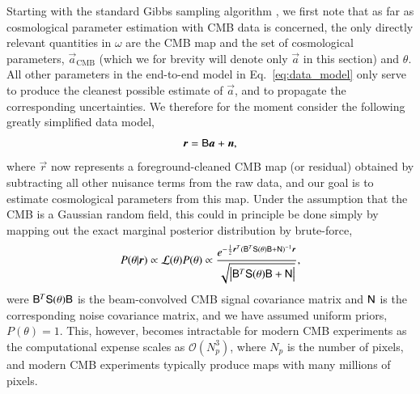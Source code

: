 \documentclass[twocolumn]{../common/aa}
\newcommand{\B}[0]{\tens{B}}
\newcommand{\n}[0]{\vec{n}}
\renewcommand{\a}[0]{\vec{a}}
\newcommand{\N}[0]{\tens{N}}
\renewcommand{\S}[0]{\tens{S}}
\renewcommand{\r}[0]{\vec{r}}
\begin{document}
Starting with the standard Gibbs sampling algorithm \citep{jewell2004,wandelt2004}, we first note that as far as cosmological parameter estimation with CMB data is concerned, the only directly relevant quantities in $\omega$ are the CMB map and the set of cosmological parameters, $\a_{\textrm{CMB}}$ (which we for brevity will denote only $\a$ in this section) and $\theta$. All other parameters in the end-to-end model in Eq.~\eqref{eq:data_model} only serve to produce the cleanest possible estimate of $\a$, and to propagate the corresponding uncertainties. We therefore for the moment consider the following greatly simplified data model,
\begin{equation}
  \r = \B\a + \n,
\end{equation}
where $\r$ now represents a foreground-cleaned CMB map (or residual) obtained by subtracting all other nuisance terms from the raw data, and our goal is to estimate cosmological parameters from this map. Under the assumption that the CMB is a Gaussian random field, this could in principle be done simply by mapping out the exact marginal posterior distribution by brute-force,
\begin{equation}
  P(\theta | \r) \propto \mathcal{L}(\theta)P(\theta) \propto \frac{e^{-\frac12 \r^T (\B^T \S(\theta) \B + \N)^{-1}\r}}{\sqrt{\left|\B^T \S(\theta) \B + \N\right|}},
  \label{eq:exact_posterior}
\end{equation}
were $\B^T \S(\theta) \B$ is the beam-convolved CMB signal covariance matrix and $\N$ is the corresponding noise covariance matrix, and we have assumed uniform priors, $P(\theta) = 1$. This, however, becomes intractable for modern CMB experiments as the computational expense scales as $\mathcal{O}(N_p^3)$, where $N_p$ is the number of pixels, and modern CMB experiments typically produce maps with many millions of pixels. 
\end{document}
